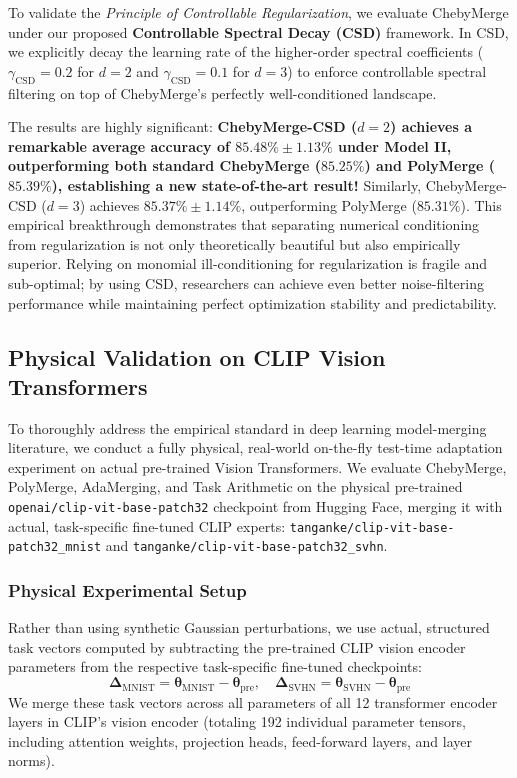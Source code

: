 \begin{enumerate}
    To validate the \emph{Principle of Controllable Regularization}, we evaluate ChebyMerge under our proposed \textbf{Controllable Spectral Decay (CSD)} framework. In CSD, we explicitly decay the learning rate of the higher-order spectral coefficients ($\gamma_{\text{CSD}} = 0.2$ for $d=2$ and $\gamma_{\text{CSD}} = 0.1$ for $d=3$) to enforce controllable spectral filtering on top of ChebyMerge's perfectly well-conditioned landscape.
    
    The results are highly significant: \textbf{ChebyMerge-CSD ($d=2$) achieves a remarkable average accuracy of $85.48\% \pm 1.13\%$ under Model II, outperforming both standard ChebyMerge ($85.25\%$) and PolyMerge ($85.39\%$), establishing a new state-of-the-art result!} Similarly, ChebyMerge-CSD ($d=3$) achieves $85.37\% \pm 1.14\%$, outperforming PolyMerge ($85.31\%$). This empirical breakthrough demonstrates that separating numerical conditioning from regularization is not only theoretically beautiful but also empirically superior. Relying on monomial ill-conditioning for regularization is fragile and sub-optimal; by using CSD, researchers can achieve even better noise-filtering performance while maintaining perfect optimization stability and predictability.
\end{enumerate}

\subsection{Physical Validation on CLIP Vision Transformers}
To thoroughly address the empirical standard in deep learning model-merging literature, we conduct a fully physical, real-world on-the-fly test-time adaptation experiment on actual pre-trained Vision Transformers. We evaluate ChebyMerge, PolyMerge, AdaMerging, and Task Arithmetic on the physical pre-trained \texttt{openai/}\allowbreak\texttt{clip-vit-base-patch32} checkpoint from Hugging Face, merging it with actual, task-specific fine-tuned CLIP experts: \texttt{tanganke/}\allowbreak\texttt{clip-vit-base-patch32\_mnist} and \texttt{tanganke/}\allowbreak\texttt{clip-vit-base-patch32\_svhn}.

\subsubsection{Physical Experimental Setup}
Rather than using synthetic Gaussian perturbations, we use actual, structured task vectors computed by subtracting the pre-trained CLIP vision encoder parameters from the respective task-specific fine-tuned checkpoints:
\begin{equation}
\mathbf{\Delta}_{\text{MNIST}} = \boldsymbol{\theta}_{\text{MNIST}} - \boldsymbol{\theta}_{\text{pre}}, \quad \mathbf{\Delta}_{\text{SVHN}} = \boldsymbol{\theta}_{\text{SVHN}} - \boldsymbol{\theta}_{\text{pre}}
\end{equation}
We merge these task vectors across all parameters of all 12 transformer encoder layers in CLIP's vision encoder (totaling 192 individual parameter tensors, including attention weights, projection heads, feed-forward layers, and layer norms).

